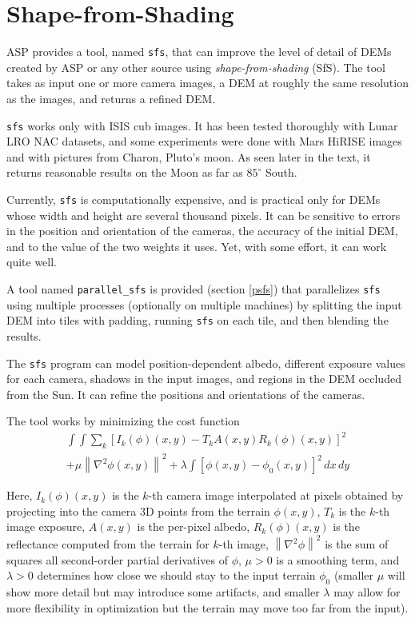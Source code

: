 \chapter{Shape-from-Shading}
\label{ch:sfs}

ASP provides a tool, named \texttt{sfs}, that can improve the level of
detail of DEMs created by ASP or any other source using
\textit{shape-from-shading} (SfS). The tool takes as input one or more
camera images, a DEM at roughly the same resolution as the images, and
returns a refined DEM.

\texttt{sfs} works only with ISIS cub images. It has been tested
thoroughly with Lunar LRO NAC datasets, and some experiments were done
with Mars HiRISE images and with pictures from Charon, Pluto's moon. As
seen later in the text, it returns reasonable results on the Moon as far
as $85^\circ$ South.

Currently, \texttt{sfs} is computationally expensive, and is practical
only for DEMs whose width and height are several thousand pixels. It can be 
sensitive to errors in the position and orientation of the cameras, the
accuracy of the initial DEM, and to the value of the two weights it uses.
Yet, with some effort, it can work quite well. 

A tool named \texttt{parallel\_sfs} is provided (section \ref{psfs}) 
that parallelizes \texttt{sfs} using multiple processes (optionally on
multiple machines) by splitting the input DEM into tiles with padding,
running \texttt{sfs} on each tile, and then blending the results. 

The \texttt{sfs} program can model position-dependent albedo, different
exposure values for each camera, shadows in the input images, and regions
in the DEM occluded from the Sun. It can refine the positions and orientations
of the cameras.

The tool works by minimizing the cost function
\begin{multline}\label{cost}
\int\!\! \int \! \sum_k \left[ I_k(\phi)(x, y) - T_k A(x, y)
 R_k(\phi)(x, y) \right]^2\,  \\
+ \mu \left\|\nabla^2 \phi(x, y) \right\|^2  
+ \lambda \int \! \left[ \phi(x, y) - \phi_0(x, y) \right]^2
\, dx\, dy
\end{multline}

Here, $I_k(\phi)(x, y)$ is the $k$-th camera image interpolated at
pixels obtained by projecting into the camera 3D points from the terrain
$\phi(x, y)$, $T_k$ is the $k$-th image exposure, $A(x, y)$ is the
per-pixel albedo, $R_k(\phi)(x, y)$ is the reflectance computed from the
terrain for $k$-th image, $\left\|\nabla^2 \phi \right\|^2 $ is the sum
of squares all second-order partial derivatives of $\phi$, $\mu > 0$
is a smoothing term, and $\lambda > 0$ determines how close we should
stay to the input terrain $\phi_0$ (smaller $\mu$ will show more detail
but may introduce some artifacts, and smaller $\lambda$ may allow for
more flexibility in optimization but the terrain may move too far from the input). 

